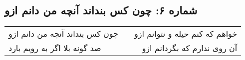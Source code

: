 \begin{center}
\section*{شماره ۶: چون کس بنداند آنچه من دانم ازو}
\label{sec:006}
\begin{longtable}{l p{0.5cm} r}
چون کس بنداند آنچه من دانم ازو
&&
خواهم که کنم حیله و نتوانم ازو
\\
صد گونه بلا اگر به رویم بارد
&&
آن روی ندارم که بگردانم ازو
\\
\end{longtable}
\end{center}
